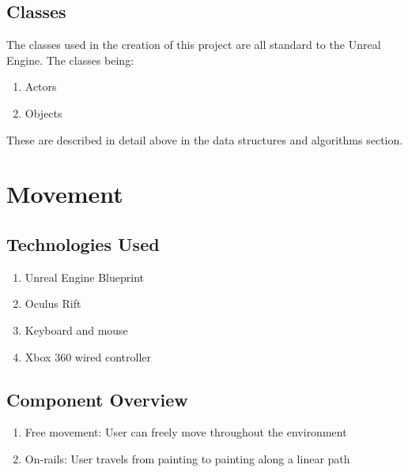  \subsection{Classes}
 The classes used in the creation of this project are all standard to the Unreal Engine.  The classes being:
 \begin{enumerate}
 \item Actors
 \item Objects
 \end{enumerate}
 
These are described in detail above in the data structures and algorithms section.
 
 

\section{ Movement }


\subsection{Technologies  Used}
\begin{enumerate}
	\item Unreal Engine Blueprint
	\item Oculus Rift
	\item Keyboard and mouse
	\item Xbox 360 wired controller
\end{enumerate}

\subsection{Component  Overview}

\begin{enumerate}
	\item Free movement:  User can freely move throughout the environment
	\item On-rails:  User travels from painting to painting along a linear path
\end{enumerate}

